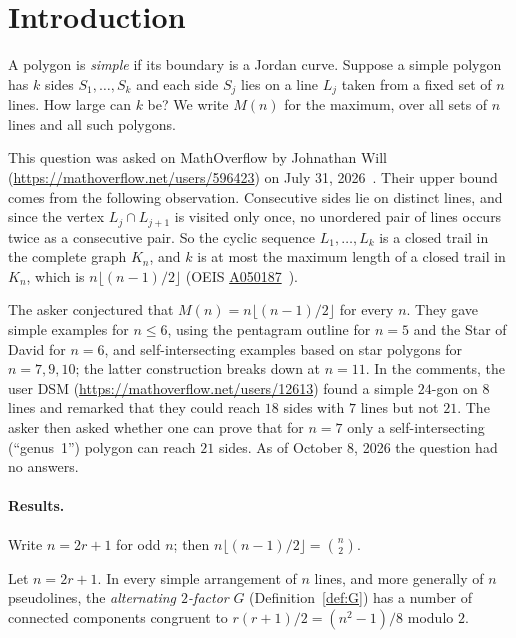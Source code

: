\section{Introduction}\label{sec:intro}

A polygon is \emph{simple} if its boundary is a Jordan curve. Suppose a simple polygon has $k$ sides
$S_1,\dots,S_k$ and each side $S_j$ lies on a line $L_j$ taken from a fixed set of $n$ lines. How
large can $k$ be? We write $M(n)$ for the maximum, over all sets of $n$ lines and all such polygons.

This question was asked on MathOverflow by Johnathan Will (\url{https://mathoverflow.net/users/596423})
on July 31, 2026~\cite{MO513798}. Their upper bound comes from the following observation. Consecutive
sides lie on distinct lines, and since the vertex $L_j\cap L_{j+1}$ is visited only once, no unordered
pair of lines occurs twice as a consecutive pair. So the cyclic sequence $L_1,\dots,L_k$ is a closed
trail in the complete graph $K_n$, and $k$ is at most the maximum length of a closed trail in $K_n$, which is
$n\lfloor (n-1)/2\rfloor$ (OEIS \href{https://oeis.org/A050187}{A050187}~\cite{A050187}).

The asker conjectured that $M(n)=n\lfloor (n-1)/2\rfloor$ for every $n$. They gave simple examples for
$n\le 6$, using the pentagram outline for $n=5$ and the Star of David for $n=6$, and self-intersecting
examples based on star polygons for $n=7,9,10$; the latter construction breaks down at $n=11$. In the
comments, the user DSM (\url{https://mathoverflow.net/users/12613}) found a simple $24$-gon on $8$ lines
and remarked that they could reach $18$ sides with $7$ lines but not $21$. The asker then asked whether
one can prove that for $n=7$ only a self-intersecting (``genus~1'') polygon can reach $21$ sides. As of
October 8, 2026 the question had no answers.

\paragraph{Results.} Write $n=2r+1$ for odd $n$; then $n\lfloor (n-1)/2\rfloor=\binom n2$.

\begin{theorem}\label{thm:parity}
Let $n=2r+1$. In every simple arrangement of $n$ lines, and more generally of $n$ pseudolines, the
\emph{alternating $2$-factor} $G$ (Definition~\ref{def:G}) has a number of connected components congruent to
$r(r+1)/2=(n^2-1)/8$ modulo $2$.
\end{theorem}

